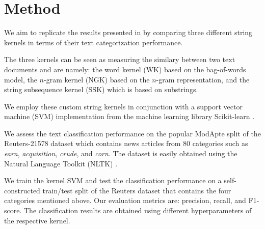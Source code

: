 \section{Method} \label{sec:method}

We aim to replicate the results presented in \cite{kernels} by comparing three different string kernels in terms of their text categorization performance.

The three kernels can be seen as measuring the similary between two text documents and are namely: the word kernel (WK) based on the bag-of-words model, the $n$-gram kernel (NGK) based on the $n$-gram representation, and the string subsequence kernel (SSK) \cite{kernels} which is based on substrings.

We employ these custom string kernels in conjunction with a support vector machine (SVM) implementation from the machine learning library Scikit-learn \cite{sklearn}.

We assess the text classification performance on the popular ModApte split of the Reuters-21578 dataset which contains news articles from $80$ categories such as \textit{earn}, \textit{acquisition}, \textit{crude}, and \textit{corn}. The dataset is easily obtained using the Natural Language Toolkit (NLTK) \cite{nltk}.

We train the kernel SVM and test the classification performance on a self-constructed train/test split of the Reuters dataset that contains the four categories mentioned above. Our evaluation metrics are: precision, recall, and F1-score. The classification results are obtained using different hyperparameters of the respective kernel.

